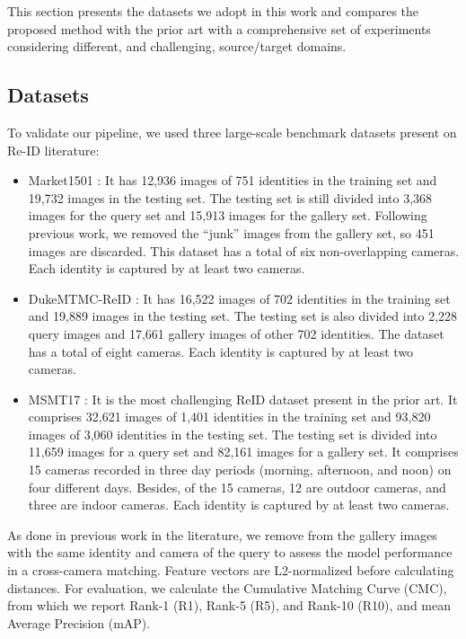 \documentclass[journal]{IEEEtran}
\begin{document}
This section presents the datasets we adopt in this work and compares the proposed method with the prior art with a comprehensive set of experiments considering different, and challenging, source/target domains.

\subsection{Datasets}
\label{subsec:datasets}
To validate our pipeline, we used three large-scale benchmark datasets present on Re-ID literature:

\begin{itemize}
    \item Market1501 \cite{zheng2015scalable}: It has 12,936 images of 751 identities in the training set and 19,732 images in the testing set. The testing set is still divided into 3,368 images for the query set and 15,913 images for the gallery set. Following previous work, we removed the ``junk'' images from the gallery set, so 451 images are discarded. This dataset has a total of six non-overlapping cameras. Each identity is captured by at least two cameras.
    
    \item DukeMTMC-ReID \cite{ristani2016performance}: It has 16,522 images of 702 identities in the training set and 19,889 images in the testing set. The testing set is also divided into 2,228 query images and 17,661 gallery images of other 702 identities. The dataset has a total of eight cameras. Each identity is captured by at least two cameras. 


    \item MSMT17 \cite{wei2018person}: It is the most challenging ReID dataset present in the prior art. It comprises 32,621 images of 1,401 identities in the training set and 93,820 images of 3,060 identities in the testing set. The testing set is divided into 11,659 images for a query set and 82,161 images for a gallery set. It comprises 15 cameras recorded in three day periods (morning, afternoon, and noon) on four different days. Besides, of the 15 cameras, 12 are outdoor cameras, and three are indoor cameras. Each identity is captured by at least two cameras. 
    
\end{itemize}

As done in previous work in the literature, we remove from the gallery images with the same identity and camera of the query to assess the model performance in a cross-camera matching. Feature vectors are L2-normalized before calculating distances. For evaluation, we calculate the Cumulative Matching Curve (CMC), from which we report Rank-1 (R1), Rank-5 (R5), and Rank-10 (R10), and mean Average Precision (mAP).
\end{document}
